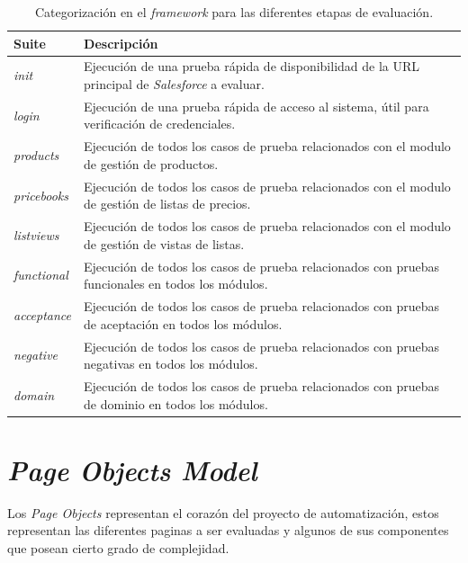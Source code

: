 \begin{table}
\centering
\begin{tabular}{|l|p{12.0cm}|}
\hline
\footnotesize{\textbf{Suite}} & \footnotesize{\textbf{Descripción}} \\
\hline
\footnotesize{\emph{init}} & \footnotesize{Ejecución de una prueba rápida de
disponibilidad de la URL principal de \emph{Salesforce} a evaluar.} \\
\footnotesize{\emph{login}} & \footnotesize{Ejecución de una prueba rápida de
acceso al sistema, útil para verificación de credenciales.} \\
\footnotesize{\emph{products}} & \footnotesize{Ejecución de todos los casos de
prueba relacionados con el modulo de gestión  de productos.} \\
\footnotesize{\emph{pricebooks}} & \footnotesize{Ejecución de todos los casos de
prueba relacionados con el modulo de gestión de listas de precios.} \\
\footnotesize{\emph{listviews}} & \footnotesize{Ejecución de todos los casos de
prueba relacionados con el modulo de gestión de vistas de listas.} \\
\footnotesize{\emph{functional}} & \footnotesize{Ejecución de todos los casos de
prueba relacionados con pruebas funcionales en todos los módulos.} \\
\footnotesize{\emph{acceptance}} & \footnotesize{Ejecución de todos los casos de
prueba relacionados con pruebas de aceptación en todos los módulos.} \\
\footnotesize{\emph{negative}} & \footnotesize{Ejecución de todos los casos de
prueba relacionados con pruebas negativas en todos los módulos.} \\
\footnotesize{\emph{domain}} & \footnotesize{Ejecución de todos los casos de
prueba relacionados con pruebas de dominio en todos los módulos.} \\
\hline
\end{tabular}
\caption{Categorización en el \emph{framework} para las diferentes etapas de evaluación.}
\label{suites}
\end{table}

\section{\emph{Page Objects Model}}
Los \emph{Page Objects} representan el corazón del proyecto de automatización,
estos representan las diferentes paginas a ser evaluadas y algunos de sus
componentes que posean cierto grado de complejidad.


